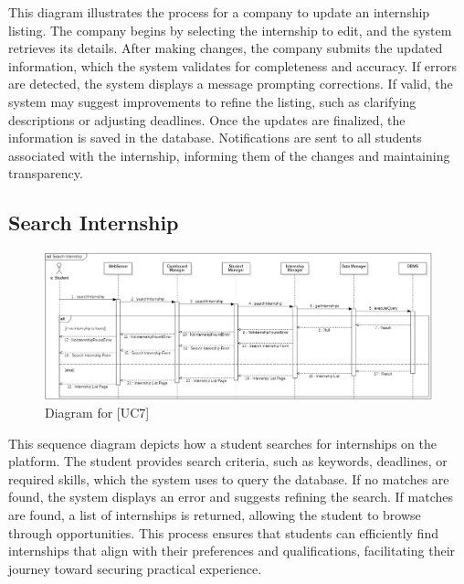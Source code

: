 This diagram illustrates the process for a company to update an internship listing. The company begins by selecting the internship to edit, and the system retrieves its details. After making changes, the company submits the updated information, which the system validates for completeness and accuracy. If errors are detected, the system displays a message prompting corrections. If valid, the system may suggest improvements to refine the listing, such as clarifying descriptions or adjusting deadlines. Once the updates are finalized, the information is saved in the database. Notifications are sent to all students associated with the internship, informing them of the changes and maintaining transparency.

\subsection{Search Internship}
\begin{figure} [H]
    \centering
    \includegraphics[width=1\linewidth]{DD/Images/Runtime Sequence Diagram Images/search_internship.png}
    \caption{Diagram for [UC7]}
    \label{fig: Search Internship Diagram}
\end{figure}

This sequence diagram depicts how a student searches for internships on the platform. The student provides search criteria, such as keywords, deadlines, or required skills, which the system uses to query the database. If no matches are found, the system displays an error and suggests refining the search. If matches are found, a list of internships is returned, allowing the student to browse through opportunities. This process ensures that students can efficiently find internships that align with their preferences and qualifications, facilitating their journey toward securing practical experience.

